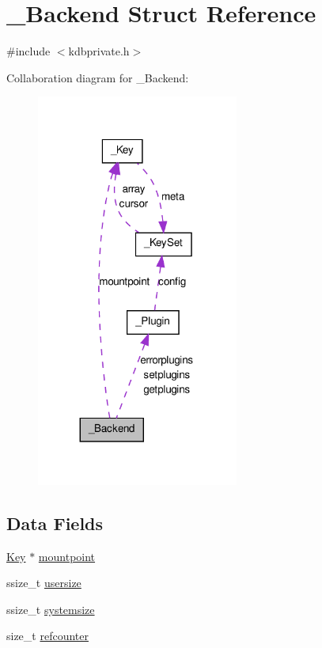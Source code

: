 \hypertarget{struct__Backend}{
\section{\_\-Backend Struct Reference}
\label{struct__Backend}
}


{\ttfamily \#include $<$kdbprivate.h$>$}



Collaboration diagram for \_\-Backend:
\nopagebreak
\begin{figure}[H]
\begin{center}
\leavevmode
\includegraphics[width=188pt]{struct__Backend__coll__graph}
\end{center}
\end{figure}
\subsection*{Data Fields}
\begin{DoxyCompactItemize}
\item 
\hyperlink{struct__Key}{Key} $\ast$ \hyperlink{struct__Backend_a5494dade5125f76ef8d77a24cdec1f84}{mountpoint}
\item 
ssize\_\-t \hyperlink{struct__Backend_a86eba6e73242d79efed2a313d25bdd76}{usersize}
\item 
ssize\_\-t \hyperlink{struct__Backend_a0af9c2bc4e327a17df20de41918d34cc}{systemsize}
\item 
size\_\-t \hyperlink{struct__Backend_a033b9df8d33fd2575bf26818fcce5bb4}{refcounter}
\end{DoxyCompactItemize}


